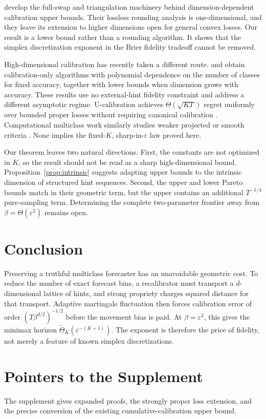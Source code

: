 \documentclass[twoside]{article}
\newcommand{\1}{\mathbf 1}
\begin{document}
\citet{fishelson2025full} develop the full-swap and triangulation machinery behind dimension-dependent calibration upper bounds. Their lossless rounding analysis is one-dimensional, and they leave its extension to higher dimensions open for general convex losses. Our result is a lower bound rather than a rounding algorithm. It shows that the simplex discretization exponent in the Brier fidelity tradeoff cannot be removed.

High-dimensional calibration has recently taken a different route. \citet{peng2025highdim} and \citet{fishelson2025highdim} obtain calibration-only algorithms with polynomial dependence on the number of classes for fixed accuracy, together with lower bounds when dimension grows with accuracy. These results use no external-hint fidelity constraint and address a different asymptotic regime. U-calibration achieves $\Theta(\sqrt{KT})$ regret uniformly over bounded proper losses without requiring canonical calibration \citep{luo2024optimal}. Computational multiclass work similarly studies weaker projected or smooth criteria \citep{gopalan2024computational}. None implies the fixed-$K$, sharp-in-$\varepsilon$ law proved here.

Our theorem leaves two natural directions. First, the constants are not optimized in $K$, so the result should not be read as a sharp high-dimensional bound. Proposition~\ref{prop:intrinsic} suggests adapting upper bounds to the intrinsic dimension of structured hint sequences. Second, the upper and lower Pareto bounds match in their geometric term, but the upper contains an additional $T^{-1/4}$ pure-sampling term. Determining the complete two-parameter frontier away from $\beta=\Theta(\varepsilon^2)$ remains open.

\section{Conclusion}

Preserving a truthful multiclass forecaster has an unavoidable geometric cost. To reduce the number of exact forecast bins, a recalibrator must transport a $d$-dimensional lattice of hints, and strong propriety charges squared distance for that transport. Adaptive martingale fluctuation then forces calibration error of order $(T\beta^{d/2})^{-1/2}$ before the movement bias is paid. At $\beta=\varepsilon^2$, this gives the minimax horizon $\widetilde\Theta_K(\varepsilon^{-(K+1)})$. The exponent is therefore the price of fidelity, not merely a feature of known simplex discretizations.

\balance


\appendix
\newpage
\section{Pointers to the Supplement}
The supplement gives expanded proofs, the strongly proper loss extension, and the precise conversion of the existing cumulative-calibration upper bound.
\end{document}
